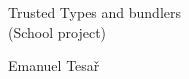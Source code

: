 \documentclass[12pt, twoside]{book}
\def\mfnazov{Trusted Types and bundlers}
\def\mftyp{(School project)}
\def\mfautor{Emanuel Tesař}
\begin{document}
     
\frontmatter


\thispagestyle{empty}

\begin{center}
  \sc\large
  
  \vspace*{\fill}
  {\LARGE\mfnazov}\\
  \mftyp
  \vspace*{\fill}
\end{center}

\vfill

{\sc\large
  \mfautor
}


\newpage 

\tableofcontents

\mainmatter










\newpage	

\backmatter

\thispagestyle{empty}
\nocite{*}
\clearpage







\end{document}
